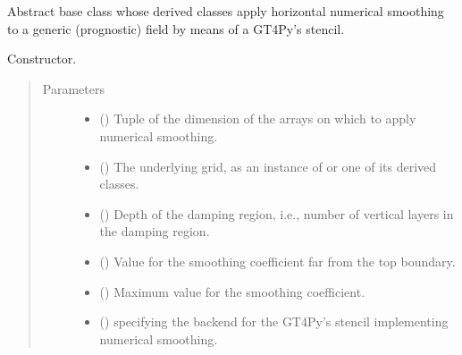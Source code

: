 \documentclass[letterpaper,10pt,english]{sphinxmanual}
\begin{document}
\begin{fulllineitems}
\label{\detokenize{api:dycore.horizontal_smoothing.HorizontalSmoothing}}
Abstract base class whose derived classes apply horizontal numerical smoothing to a generic (prognostic)
field by means of a GT4Py’s stencil.

\begin{fulllineitems}
\label{\detokenize{api:dycore.horizontal_smoothing.HorizontalSmoothing.__init__}}
Constructor.
\begin{quote}\begin{description}
\item[{Parameters}] \leavevmode\begin{itemize}
\item {} 
 () \textendash{} Tuple of the dimension of the arrays on which to apply numerical smoothing.

\item {} 
 () \textendash{} The underlying grid, as an instance of {\hyperref[\detokenize{api:grids.grid_xyz.GridXYZ}]{}} or one of its derived classes.

\item {} 
 () \textendash{} Depth of the damping region, i.e., number of vertical layers in the damping region.

\item {} 
 () \textendash{} Value for the smoothing coefficient far from the top boundary.

\item {} 
 () \textendash{} Maximum value for the smoothing coefficient.

\item {} 
 () \textendash{}  specifying the backend for the GT4Py’s stencil implementing numerical smoothing.


\end{itemize}
\end{description}
\end{quote}
\end{fulllineitems}
\end{fulllineitems}
\end{document}
